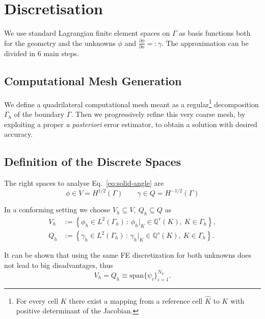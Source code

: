 
\section{Discretisation}
\label{sec:Discretisation}

We use standard Lagrangian finite element spaces on $\Gamma$ as basis functions both for the geometry and the unknowns $\phi$ and $\frac{\partial\phi}{\partial n}=:\gamma$. The approximation can be divided in 6 main steps.

\subsection{Computational Mesh Generation}
\label{sub:computational_mesh_generation}

We define a quadrilateral computational mesh meant as a regular\footnote{For every cell $K$ there exist a mapping from a reference cell $\hat{K}$ to $K$ with positive determinant of the Jacobian.} decomposition $\Gamma_h$ of the boundary $\Gamma$. Then we progressively refine this very coarse mesh, by exploiting a proper \emph{a posteriori} error estimator, to obtain a solution with desired accuracy.

\subsection{Definition of the Discrete Spaces}
\label{sub:definition_of_the_discrete_spaces}

The right spaces to analyse Eq.~\eqref{eq:solid-angle} are
\begin{equation*}
\phi\in V=H^{1/2}(\Gamma)\qquad \gamma\in Q=H^{-1/2}(\Gamma)
\end{equation*}

In a conforming setting we choose $V_h\subseteq V,\ Q_h\subseteq Q$ as
\begin{subequations}
\label{eq:FEspaces}
\begin{align}
\label{eq:Vhspace}
V_h&:=\left\{ \phi_h\in L^2(\Gamma_h)\,:\,\phi_h\big|_K\in \mathbb{Q}^r(K),\ K\in\Gamma_h \right\}, \\
\label{eq:Qhspace} 
Q_h&:=\left\{ \gamma_h\in L^2(\Gamma_h)\,:\,\gamma_h\big|_K\in \mathbb{Q}^s(K),\ K\in\Gamma_h \right\}.
\end{align}
\end{subequations}


It can be shown that using the same FE discretization for both unknowns does not lead to big disadvantages, thus
\begin{equation*}
V_h=Q_h\equiv \text{span}\{\psi_i\}_{i=1}^{N_V}.
\end{equation*}

